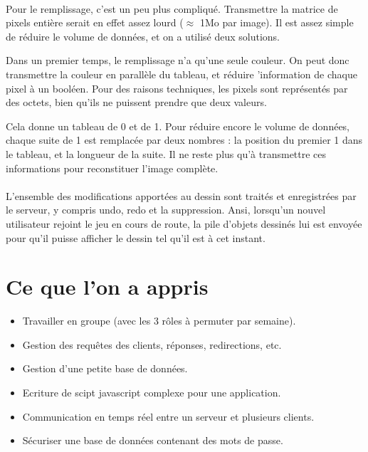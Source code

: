 \documentclass[11pt,a4paper]{article}
\begin{document}
                \paragraph{}
                Pour le remplissage, c'est un peu plus compliqué.
                Transmettre la matrice de pixels entière serait en effet assez lourd ($\approx$ 1Mo par image).
                Il est assez simple de réduire le volume de données, et on a utilisé deux solutions.
                
                Dans un premier temps, le remplissage n'a qu'une seule couleur.
                On peut donc transmettre la couleur en parallèle du tableau,
                et réduire 'information de chaque pixel à un booléen.
                Pour des raisons techniques, les pixels sont représentés par des octets,
                bien qu'ils ne puissent prendre que deux valeurs.

                Cela donne un tableau de 0 et de 1.
                Pour réduire encore le volume de données,
                chaque suite de 1 est remplacée par deux nombres :
                la position du premier 1 dans le tableau, et la longueur de la suite.
                Il ne reste plus qu'à transmettre ces informations pour reconstituer l'image complète.
                \paragraph{}
                L'ensemble des modifications apportées au dessin sont traités et enregistrées par le serveur,
                y compris undo, redo et la suppression.
                Ansi, lorsqu'un nouvel utilisateur rejoint le jeu en cours de route,
                la pile d'objets dessinés lui est envoyée pour qu'il puisse afficher le dessin tel qu'il est à cet instant.

    \section{Ce que l'on a appris}
        \begin{itemize}
            \item Travailler en groupe (avec les 3 rôles à permuter par semaine).
            \item Gestion des requêtes des clients, réponses, redirections, etc.
            \item Gestion d'une petite base de données.
            \item Ecriture de scipt javascript complexe pour une application.
            \item Communication en temps réel entre un serveur et plusieurs clients.
            \item Sécuriser une base de données contenant des mots de passe.
        \end{itemize}
\end{document}
